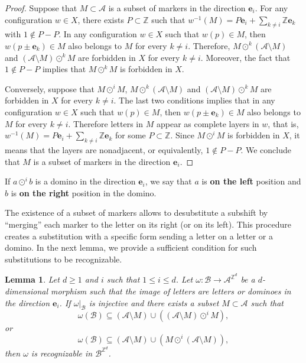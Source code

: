 \documentclass[12pt]{amsart}
\newtheorem{lemma}[definition]{Lemma}
\newcommand{\Z}{\mathbb{Z}}
\newcommand{\be}{{\boldsymbol{e}}}
\newcommand{\Acal}{\mathcal{A}} %
\newcommand{\Bcal}{\mathcal{B}}
\newcommand{\ifnv}[2]{\ifthenelse{\equal{#1}{}}{}{#2}}
\newcommand\defn[2][]{\ifnv{#1}{\index{#1|\textbf}}{\index{#2|\textbf}}\textbf{#2}}
\begin{document}
\begin{proof}
    Suppose that $M\subset\Acal$ is a subset of markers in the
    direction $\be_i$.
    For any configuration $w\in X$,
    there exists $P\subset\Z$ such that
        $w^{-1}(M) = P\be_i +\sum_{k\neq i} \Z\be_k$ with 
        $1\notin P-P$.
    In any configuration $w\in X$ such that $w(p)\in M$,
    then $w(p\pm\be_k)\in M$ also belongs to $M$ for every $k\neq i$.
    Therefore, $M\odot^k (\Acal\setminus M)$ and $(\Acal\setminus M) \odot^k M$
    are forbidden in $X$ for every $k\neq i$.
    Moreover, the fact that
        $1\notin P-P$ implies that
        $M\odot^k M$ is forbidden in $X$.

    Conversely, suppose that
        $M\odot^i M$,
        $M\odot^k (\Acal\setminus M)$ and
        $(\Acal\setminus M) \odot^k M$
    are forbidden in $X$ for every $k\neq i$.
    The last two conditions implies that 
    in any configuration $w\in X$ such that $w(p)\in M$,
    then $w(p\pm\be_k)\in M$ also belongs to $M$ for every $k\neq i$.
    Therefore letters in $M$ appear as complete layers in $w$, that is,
        $w^{-1}(M) = P\be_i +\sum_{k\neq i} \Z\be_k$
        for some $P\subset\Z$.
    Since $M\odot^i M$ is forbidden in $X$, it means that
    the layers are nonadjacent, or equivalently, $1\notin P-P$.
    We conclude that $M$ is a subset of markers in the
    direction $\be_i$.
\end{proof}

If $a\odot^i b$ is a domino in the direction $\be_i$,
we say that $a$ is \defn{on the left} position and $b$ is \defn{on the right}
position in the domino.

The existence of a subset of markers allows to desubstitute a subshift by
``merging'' each marker to the letter on its right (or on its left).
This procedure creates a substitution with a specific form sending a letter on
a letter or a domino. 
In the next lemma, we provide a sufficient condition for
such substitutions to be recognizable.

\begin{lemma}\label{lem:recognizable}
    Let $d\geq1$ and $i$ such that $1\leq i\leq d$.
Let $\omega:\Bcal\to\Acal^{\Z^d}$ be a $d$-dimensional morphism such that
the image of letters are letters or dominoes in the direction $\be_i$.
If $\omega|_\Bcal$ is injective and there exists a subset $M\subset \Acal$ such that
\begin{equation}\label{eq:markers-on-right}
    \omega(\Bcal)
    \subseteq (\Acal\setminus M)
    \cup \left((\Acal\setminus M)\odot^i M\right),
\end{equation}
or
\begin{equation}\label{eq:markers-on-left}
    \omega(\Bcal)
    \subseteq (\Acal\setminus M)
    \cup \left(M\odot^i (\Acal\setminus M)\right),
\end{equation}
    then $\omega$ is recognizable in $\Bcal^{\Z^d}$.
\end{lemma}
\end{document}

